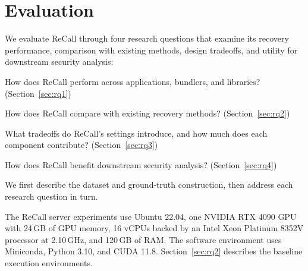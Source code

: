 \section{Evaluation}
\label{sec:evaluation}

We evaluate ReCall through four research questions that examine its recovery performance, comparison with existing methods, design tradeoffs, and utility for downstream security analysis:
\begin{list}{}{%
    \setlength{\labelwidth}{3.3em}%
    \setlength{\labelsep}{0.6em}%
    \setlength{\leftmargin}{3.9em}%
    \setlength{\rightmargin}{0pt}%
    \setlength{\topsep}{5pt}%
    \setlength{\itemsep}{4pt}%
    \setlength{\parsep}{0pt}%
    \renewcommand{\makelabel}[1]{\raisebox{0.25ex}{{\scriptsize\textbullet}}\hspace{0.5em}\textbf{#1}\hfil}}
    \item[RQ1] How does ReCall perform across applications, bundlers, and libraries? (Section~\ref{sec:rq1})
    \item[RQ2] How does ReCall compare with existing recovery methods? (Section~\ref{sec:rq2})
    \item[RQ3] What tradeoffs do ReCall's settings introduce, and how much does each component contribute? (Section~\ref{sec:rq3})
    \item[RQ4] How does ReCall benefit downstream security analysis? (Section~\ref{sec:rq4})
\end{list}
We first describe the dataset and ground-truth construction, then address each research question in turn.

The ReCall server experiments use Ubuntu 22.04, one NVIDIA RTX 4090 GPU with 24\,GB of GPU memory, 16 vCPUs backed by an Intel Xeon Platinum 8352V processor at 2.10\,GHz, and 120\,GB of RAM. The software environment uses Miniconda, Python 3.10, and CUDA 11.8. Section~\ref{sec:rq2} describes the baseline execution environments.







